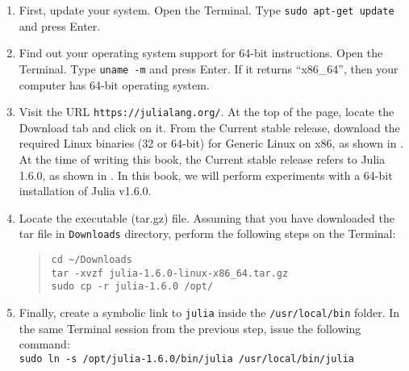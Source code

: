 \begin{enumerate}
      \item First, update your system. Open the Terminal. Type
                  {\tt sudo apt-get update} and press Enter.
      \item Find out your operating system support for 64-bit
            instructions. Open the Terminal. Type {\tt uname -m} and press Enter. If it returns ``x86\_64'', then your computer has 64-bit
            operating system.
      \item Visit the URL {\tt https://julialang.org/}.  At the top of the page,
            locate the Download tab and click on it. From the Current stable release, download the
            required Linux binaries (32 or 64-bit) for Generic Linux on x86, as shown in .
            At the time of writing this book, the Current stable release refers to Julia 1.6.0,
            as shown in  . In this book, we will perform experiments with a 64-bit installation of Julia  v1.6.0.
      \item Locate the executable (tar.gz) file. Assuming that you have downloaded the tar file in {\tt Downloads} directory, perform the following
            steps on the Terminal:
            \begin{quote}
                  {\tt cd {\large\textasciitilde}/Downloads\\
                        tar -xvzf julia-1.6.0-linux-x86\_64.tar.gz\\
                        sudo cp -r julia-1.6.0 /opt/}
            \end{quote}
      \item Finally, create a symbolic link to {\tt julia} inside the
                  {\tt /usr/local/bin} folder. In the same Terminal session from the previous step, issue the
            following command: \\
            {\tt sudo ln -s /opt/julia-1.6.0/bin/julia /usr/local/bin/julia}
\end{enumerate}

